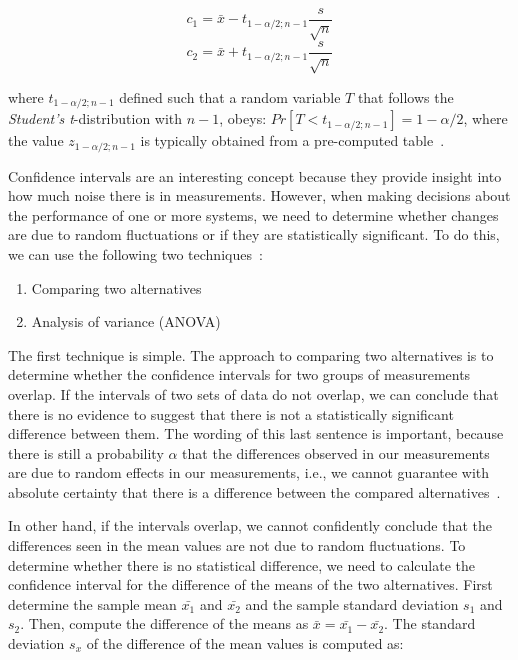 \begin{equation}
c_1 = \bar{x} - t_{1-\alpha/2;n-1}\frac{s}{\sqrt{n}}
\end{equation}
\begin{equation}
c_2 = \bar{x} + t_{1-\alpha/2;n-1}\frac{s}{\sqrt{n}}
\end{equation}

where \(t_{1 - \alpha/2;n-1}\) defined such that a random variable \(T\) that
follows the \emph{Student's t}-distribution with \(n - 1\), obeys: \(Pr[T < t_{1 -
   \alpha/2;n - 1}] = 1 - \alpha/2\), where the value \(z_{1 - \alpha/2;n - 1}\)
is typically obtained from a pre-computed table~\cite{DBLP_conf_oopsla_GeorgesBE07,lilja2005measuring}.

Confidence intervals are an interesting concept because they provide insight into how much noise there is in measurements. However, when making decisions about the performance of one or more systems, we need to determine whether changes are due to random fluctuations or if they are statistically significant. To do this, we can use the following two techniques~\cite{DBLP_conf_oopsla_GeorgesBE07, lilja2005measuring}:

\begin{enumerate}
\item Comparing two alternatives
\item Analysis of variance (ANOVA)
\end{enumerate}

The first technique is simple. The approach to comparing two alternatives is to determine whether the confidence intervals for two groups of measurements overlap. If the intervals of two sets of data do not overlap, we can conclude that there is no evidence to suggest that there is not a statistically significant difference between them. The wording of this last sentence is important, because there is still a probability \(\alpha\) that the differences observed in our measurements are due to random effects in our measurements, i.e., we cannot guarantee with absolute certainty that there is a difference between the compared alternatives~\cite{DBLP_conf_oopsla_GeorgesBE07}.

In other hand, if the intervals overlap, we cannot confidently conclude that the differences seen in the mean values are not due to random fluctuations. To determine whether there is no statistical difference, we need to calculate the confidence interval for the difference of the means of the two alternatives. First determine the sample mean \(\bar{x_1}\) and \(\bar{x_2}\) and the sample standard deviation \(s_1\) and \(s_2\). Then, compute the difference of the means as \(\bar{x} = \bar{x_1} - \bar{x_2}\). The standard deviation \(s_x\) of the difference of the mean values is computed as:

